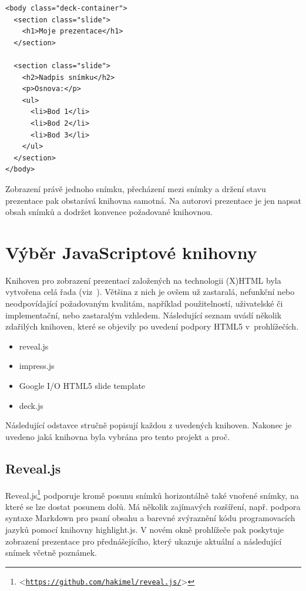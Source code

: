 \documentclass[11pt,twoside,a4paper]{book}
\let\oldUrl\url									%
\renewcommand\url[1]{<\texttt{\oldUrl{#1}}>}
\begin{document}
\begin{lstlisting}[caption=Ukázka zdrojového kódu HTML prezentace (deck.js)]
<body class="deck-container">
  <section class="slide">
    <h1>Moje prezentace</h1>
  </section>

  <section class="slide">
    <h2>Nadpis snímku</h2>
    <p>Osnova:</p>
    <ul>
      <li>Bod 1</li>
      <li>Bod 2</li>
      <li>Bod 3</li>
    </ul>
  </section>
</body>
\end{lstlisting}

Zobrazení právě jednoho snímku, přecházení mezi snímky a držení stavu prezentace pak obstarává knihovna samotná. Na autorovi prezentace je jen napsat obsah snímků a dodržet konvence požadované knihovnou.


\section{Výběr JavaScriptové knihovny}
Knihoven pro zobrazení prezentací založených na technologii (X)HTML byla vytvořena celá řada (viz~\cite{htmlslideshowweb}). Většina z nich je ovšem už zastaralá, nefunkční nebo neodpovídající požadovaným kvalitám, například použitelností, uživatelské či implementační, nebo zastaralým vzhledem. Následující seznam uvádí několik zdařilých knihoven, které se objevily po uvedení podpory HTML5 v~prohlížečích.

\begin{itemize}
	\item reveal.js
	\item impress.js
	\item Google I/O HTML5 slide template
	\item deck.js
\end{itemize}

Následující odstavce stručně popisují každou z uvedených knihoven. Nakonec je uvedeno jaká knihovna byla vybrána pro tento projekt a proč.

\subsection{Reveal.js} \label{chap:revealjs}
Reveal.js\footnote{\url{https://github.com/hakimel/reveal.js/}} podporuje kromě posunu snímků horizontálně také vnořené snímky, na které se lze dostat posunem dolů. Má několik zajímavých rozšíření, např. podpora syntaxe Markdown pro psaní obsahu a barevné zvýraznění kódu programovacích jazyků pomocí knihovny highlight.js. V novém okně prohlížeče pak poskytuje zobrazení prezentace pro přednášejícího, který ukazuje aktuální a následující snímek včetně poznámek.
\end{document}
